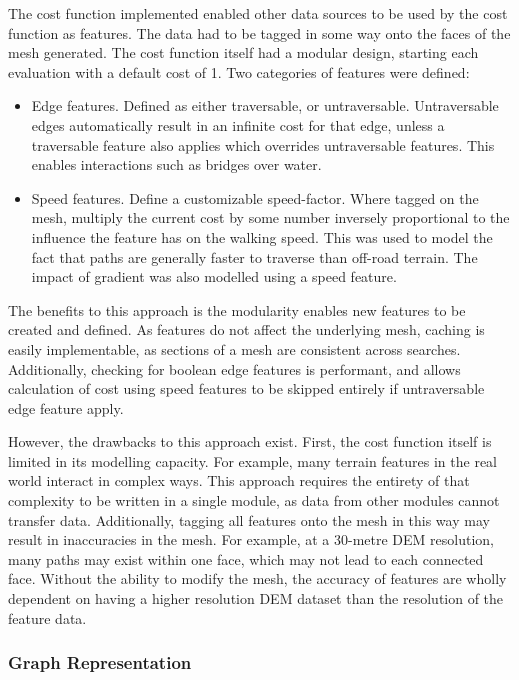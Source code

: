 \documentclass[12pt]{article}
\begin{document}
The cost function implemented enabled other data sources to be used by the cost function as features. The data had to be tagged in some way onto the faces of the mesh generated. The cost function itself had a modular design, starting each evaluation with a default cost of 1. Two categories of features were defined:

\begin{itemize}
  \item Edge features. Defined as either traversable, or untraversable. Untraversable edges automatically result in an infinite cost for that edge, unless a traversable feature also applies which overrides untraversable features. This enables interactions such as bridges over water.
  \item Speed features. Define a customizable speed-factor. Where tagged on the mesh, multiply the current cost by some number inversely proportional to the influence the feature has on the walking speed. This was used to model the fact that paths are generally faster to traverse than off-road terrain. The impact of gradient was also modelled using a speed feature.
\end{itemize}

The benefits to this approach is the modularity enables new features to be created and defined. As features do not affect the underlying mesh, caching is easily implementable, as sections of a mesh are consistent across searches. Additionally, checking for boolean edge features is performant, and allows calculation of cost using speed features to be skipped entirely if untraversable edge feature apply.

However, the drawbacks to this approach exist. First, the cost function itself is limited in its modelling capacity. For example, many terrain features in the real world interact in complex ways. This approach requires the entirety of that complexity to be written in a single module, as data from other modules cannot transfer data. Additionally, tagging all features onto the mesh in this way may result in inaccuracies in the mesh. For example, at a 30-metre DEM resolution, many paths may exist within one face, which may not lead to each connected face. Without the ability to modify the mesh, the accuracy of features are wholly dependent on having a higher resolution DEM dataset than the resolution of the feature data.

\subsubsection{Graph Representation}\label{section:context:er:graph}
\end{document}
